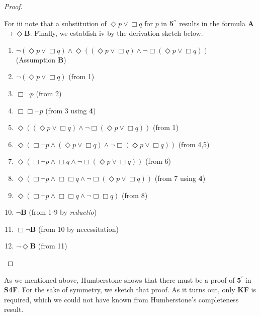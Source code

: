 \begin{proof}
\begin{enumerate}
\end{enumerate}
For iii note that a substitution of $\Diamond{p}\vee \Box q$ for $p$ in \textbf{5}$^{\prime\prime}$ results in the formula \textbf{A}$\rightarrow \Diamond\textbf{B}$.
Finally, we establish iv by the derivation sketch below.
\begin{enumerate}
\item{$ \neg (\Diamond{p}\vee \Box q) \wedge \Diamond((\Diamond{p}\vee \Box q) \wedge \neg \Box (\Diamond{p}\vee \Box q))$ \\ \tab\tab\tab\tab\tab\tab (Assumption \textbf{B})}
\item{$\neg (\Diamond{p}\vee \Box q)$ \tab\tab\tab\tab(from 1)}
\item{$ \Box \neg p$ \tab\tab\tab\tab\tab(from 2)}
\item{$ \Box \Box \neg p$ \tab\tab\tab\tab\tab(from 3 using \textbf{4})}
\item{$ \Diamond((\Diamond{p}\vee \Box q) \wedge \neg \Box (\Diamond{p}\vee \Box q))$ \tab\tab(from 1)}
\item{$ \Diamond(\Box \neg p \wedge (\Diamond{p}\vee \Box q) \wedge \neg \Box (\Diamond{p}\vee \Box q))$ \tab\tab(from 4,5)}
\item{$ \Diamond(\Box \neg p \wedge \Box q \wedge \neg \Box (\Diamond{p}\vee \Box q))$ \tab\tab(from 6)}
\item{$ \Diamond(\Box \neg p \wedge \Box \Box q \wedge \neg \Box (\Diamond{p}\vee \Box q))$ \tab\tab(from 7 using \textbf{4})}
\item{$\Diamond(\Box \neg p \wedge \Box \Box q \wedge \neg \Box \Box q)$ \tab\tab\tab(from 8)}
\item{$ \neg $\textbf{B} \tab\tab\tab\tab\tab(from 1-9 by \textit{reductio})}
\item{$ \Box \neg $\textbf{B} \tab\tab\tab\tab\tab(from 10 by necessitation)}
\item{$ \neg \Diamond$\textbf{B} \tab\tab\tab\tab\tab(from 11)}
\end{enumerate} 
\end{proof}
As we mentioned above, Humberstone shows that there must be a proof of \textbf{5}$^\prime$ in \textbf{S4F}. For the sake of symmetry, we sketch that proof. As it turns out, only \textbf{KF} is required, which we could not have known from Humberstone's completeness result.

